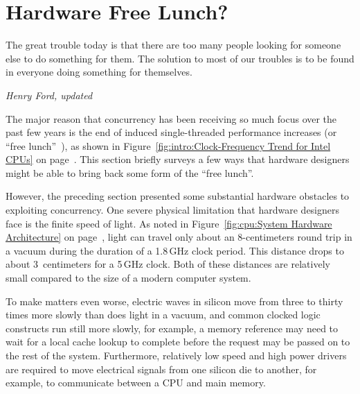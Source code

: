 
\section{Hardware Free Lunch?}
\label{sec:cpu:Hardware Free Lunch?}
%
\epigraph{The great trouble today is that there are too many people looking
	  for someone else to do something for them.
	  The solution to most of our troubles is to be found in everyone
	  doing something for themselves.}
	 {\emph{Henry Ford, updated}}

The major reason that concurrency has been receiving so much focus over
the past few years is the end of 
induced single-threaded
performance increases
(or ``free lunch''~\cite{HerbSutter2008EffectiveConcurrency}),
as shown in
Figure~\ref{fig:intro:Clock-Frequency Trend for Intel CPUs} on
page~\pageref{fig:intro:Clock-Frequency Trend for Intel CPUs}.
This section briefly surveys a few ways that hardware designers
might be able to bring back some form of the ``free lunch''.

However, the preceding section presented some substantial hardware
obstacles to exploiting concurrency.
One severe physical limitation that hardware designers face is the
finite speed of light.
As noted in
Figure~\ref{fig:cpu:System Hardware Architecture} on
page~\pageref{fig:cpu:System Hardware Architecture},
light can travel only about an 8-centimeters round trip
in a vacuum during the duration of a 1.8\,GHz clock period.
This distance drops to about 3~centimeters for a 5\,GHz clock.
Both of these distances are relatively small compared to the size
of a modern computer system.

To make matters even worse, electric waves in silicon move from three to
thirty times more slowly than does light in a vacuum, and common
clocked logic constructs run still more slowly, for example, a
memory reference may need to wait for a local cache lookup to complete
before the request may be passed on to the rest of the system.
Furthermore, relatively low speed and high power drivers are required
to move electrical signals from one silicon die to another, for example,
to communicate between a CPU and main memory.

